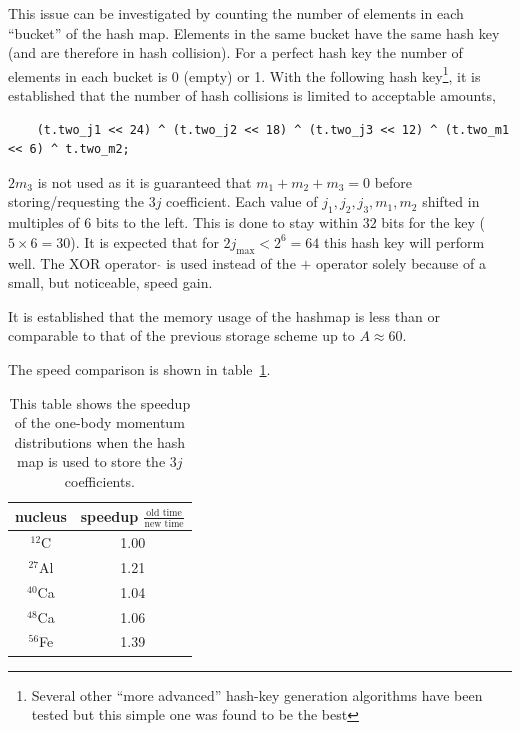 \documentclass[10pt]{article}
\begin{document}
This issue can be investigated by counting the number of elements in each ``bucket'' of the hash map.
Elements in the same bucket have the same hash key (and are therefore in hash collision).
For a perfect hash key the number of elements in each bucket is 0 (empty) or 1.
With the following hash key\footnote{Several other ``more advanced'' hash-key generation algorithms have been tested but this simple one was found to be the best}, it is established that the number of hash collisions is limited to acceptable amounts,
\begin{verbatim}
	(t.two_j1 << 24) ^ (t.two_j2 << 18) ^ (t.two_j3 << 12) ^ (t.two_m1 << 6) ^ t.two_m2;
\end{verbatim}
$2 m_3$ is not used as it is guaranteed that $m_1+m_2+m_3=0$ before storing/requesting the $3j$ coefficient.
Each value of $j_1,j_2,j_3,m_1,m_2$ shifted in multiples of $6$ bits to the left.
This is done to stay within $32$ bits for the key ($5 \times 6 = 30$).
It is expected that for $2j_{\text{max}} < 2^{6} = 64$ this hash key will perform well.
The XOR operator $\hat{}$ is used instead of the $+$ operator solely because of a small, but noticeable, speed gain.

It is established that the memory usage of the hashmap is less than or comparable to that of the previous storage scheme up to $A \approx 60$.

The speed comparison is shown in table~\ref{tab:speed_comp}.

\begin{table}
\centering
\begin{tabular}{c | c}
nucleus & speedup $\frac{\text{old time}}{\text{new time}}$ \\ \hline
$^{12}$C   & 1.00 \\
$^{27}$Al  & 1.21 \\
$^{40}$Ca  & 1.04 \\
$^{48}$Ca  & 1.06 \\
$^{56}$Fe  & 1.39 
\end{tabular}
\caption{This table shows the speedup of the one-body momentum distributions when the hash map is used to store the $3j$ coefficients.}
\label{tab:speed_comp}
\end{table}
\end{document}
